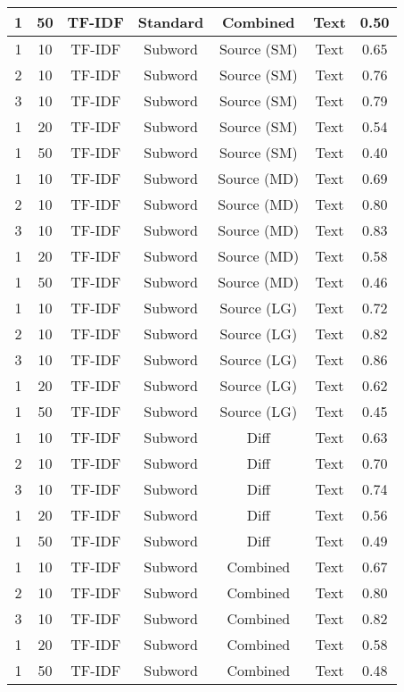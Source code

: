 \begin{longtable}{|c|c|c|c|c|c|c|}
\hline
1 & 50 & TF-IDF & Standard & Combined & Text & 0.50 \\
\hline
1 & 10 & TF-IDF & Subword & Source (SM) & Text & 0.65 \\
\hline
2 & 10 & TF-IDF & Subword & Source (SM) & Text & 0.76 \\
\hline
3 & 10 & TF-IDF & Subword & Source (SM) & Text & 0.79 \\
\hline
1 & 20 & TF-IDF & Subword & Source (SM) & Text & 0.54 \\
\hline
1 & 50 & TF-IDF & Subword & Source (SM) & Text & 0.40 \\
\hline
1 & 10 & TF-IDF & Subword & Source (MD) & Text & 0.69 \\
\hline
2 & 10 & TF-IDF & Subword & Source (MD) & Text & 0.80 \\
\hline
3 & 10 & TF-IDF & Subword & Source (MD) & Text & 0.83 \\
\hline
1 & 20 & TF-IDF & Subword & Source (MD) & Text & 0.58 \\
\hline
1 & 50 & TF-IDF & Subword & Source (MD) & Text & 0.46 \\
\hline
1 & 10 & TF-IDF & Subword & Source (LG) & Text & 0.72 \\
\hline
2 & 10 & TF-IDF & Subword & Source (LG) & Text & 0.82 \\
\hline
3 & 10 & TF-IDF & Subword & Source (LG) & Text & 0.86 \\
\hline
1 & 20 & TF-IDF & Subword & Source (LG) & Text & 0.62 \\
\hline
1 & 50 & TF-IDF & Subword & Source (LG) & Text & 0.45 \\
\hline
1 & 10 & TF-IDF & Subword & Diff & Text & 0.63 \\
\hline
2 & 10 & TF-IDF & Subword & Diff & Text & 0.70 \\
\hline
3 & 10 & TF-IDF & Subword & Diff & Text & 0.74 \\
\hline
1 & 20 & TF-IDF & Subword & Diff & Text & 0.56 \\
\hline
1 & 50 & TF-IDF & Subword & Diff & Text & 0.49 \\
\hline
1 & 10 & TF-IDF & Subword & Combined & Text & 0.67 \\
\hline
2 & 10 & TF-IDF & Subword & Combined & Text & 0.80 \\
\hline
3 & 10 & TF-IDF & Subword & Combined & Text & 0.82 \\
\hline
1 & 20 & TF-IDF & Subword & Combined & Text & 0.58 \\
\hline
1 & 50 & TF-IDF & Subword & Combined & Text & 0.48 \\

\end{longtable}
